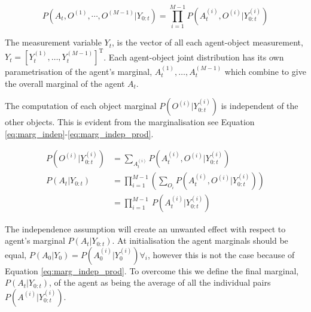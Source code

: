 \begin{equation}\label{eq:pair_wise_joint}
 P(A_t,O^{(1)},\cdots,O^{(M-1)}|Y_{0:t}) = \prod\limits_{i=1}^{M-1} P(A^{(i)}_t,O^{(i)}|Y^{(i)}_{0:t})
\end{equation}

The measurement variable $Y_t$, is the vector of all each agent-object 
measurement, $Y_t = \left[Y^{(1)}_t,\dots,Y^{(M-1)}_t\right]^{\mathrm{T}}$. Each agent-object joint distribution has its own parametrisation of the agent's marginal,
$A^{(1)}_t,\dots,A^{(M-1)}_t$ which combine to give the overall marginal of the agent $A_t$.


The computation of each object marginal $P(O^{(i)}|Y^{(i)}_{0:t})$ is independent of the other objects. This is evident from the marginalisation 
see Equation \ref{eq:marg_indep}-\ref{eq:marg_indep_prod}.

\begin{align}
 P(O^{(i)}|Y^{(i)}_{0:t}) &= \sum\limits_{A^{(i)}_t} P(A^{(i)}_t,O^{(i)}|Y^{(i)}_{0:t}) \label{eq:marg_indep} \\
 P(A_t|Y_{0:t})           &= \prod\limits_{i=1}^{M-1} \left(\sum\limits_{O_i} P(A^{(i)}_t,O^{(i)}|Y^{(i)}_{0:t})\right)  \\
	                  &= \prod\limits_{i=1}^{M-1} \ P(A^{(i)}_t|Y^{(i)}_{0:t}) \label{eq:marg_indep_prod}
\end{align}

The independence assumption will create an unwanted effect with respect to agent's marginal $P(A_t|Y_{0:t})$. 
At initialisation the agent marginals should be equal, $P(A_0|Y_0) = P(A^{(i)}_0|Y^{(i)}_0) \forall_i$, however this is not the case because of 
Equation \ref{eq:marg_indep_prod}. To overcome this we define the final marginal, $P(A_t|Y_{0:t})$, of the agent as being the average of all the individual
pairs $P(A^{(i)}|Y^{(i)}_{0:t})$.

